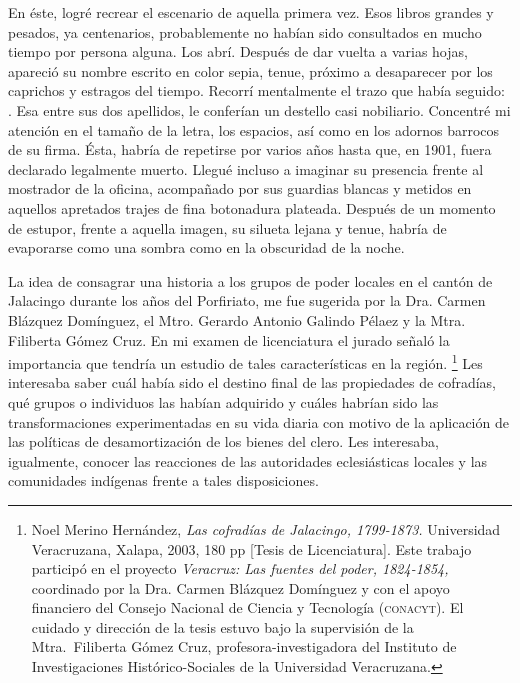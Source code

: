 \documentclass[14pt,twoside,final]{extbook} %
\let\oldfootnote\footnote
\renewcommand\footnote[1]{%
\oldfootnote{\hspace{1mm}#1}}
\begin{document}
En éste, logré recrear el escenario de aquella primera vez. Esos libros grandes y pesados, ya centenarios, probablemente no habían sido consultados en mucho tiempo por persona alguna. Los abrí. Después de dar vuelta a varias hojas, apareció su nombre escrito en color sepia, tenue, próximo a desaparecer por los caprichos y estragos del tiempo. Recorrí mentalmente el trazo que había seguido: . Esa \kern5pt entre sus dos apellidos, le conferían un destello casi nobiliario. Concentré mi atención en el tamaño de la letra, los espacios, así como en los adornos barrocos de su firma. Ésta, habría de repetirse por varios años hasta que, en 1901, fuera declarado legalmente muerto. Llegué incluso a imaginar su presencia frente al mostrador de la oficina, acompañado por sus guardias blancas y metidos en aquellos apretados trajes de fina botonadura plateada. Después de un momento de estupor, frente a aquella imagen, su silueta lejana y tenue, habría de evaporarse como una sombra como en la obscuridad de la noche.

La idea de consagrar una historia a los grupos de poder locales en el cantón de Jalacingo durante los años del Porfiriato, me fue sugerida por la Dra. Carmen Blázquez Domínguez, el Mtro. Gerardo Antonio Galindo Pélaez y la Mtra. Filiberta Gómez Cruz. En mi examen de licenciatura el jurado señaló la importancia que tendría un estudio de tales características en la región.\footnote{Noel Merino Hernández, \emph{Las cofradías de Jalacingo, 1799-1873.} Universidad Veracruzana, Xalapa, 2003, 180 pp [Tesis de Licenciatura]. Este trabajo participó en el proyecto \emph{Veracruz: Las fuentes del poder, 1824-1854,} coordinado por la Dra. Carmen Blázquez Domínguez y con el apoyo financiero del Consejo Nacional de Ciencia y Tecnología (\textsc{conacyt}). El cuidado y dirección de la tesis estuvo bajo la supervisión de la Mtra.~Filiberta Gómez Cruz, profesora-investigadora del Instituto de Investigaciones Histórico-Sociales de la Universidad Veracruzana.} Les interesaba saber cuál había sido el destino final de las propiedades de cofradías, qué grupos o individuos las habían adquirido y cuáles habrían sido las transformaciones experimentadas en su vida diaria con motivo de la aplicación de las políticas de desamortización de los bienes del clero. Les interesaba, igualmente, conocer las reacciones de las autoridades eclesiásticas locales y las comunidades indígenas frente a tales disposiciones.
\end{document}
